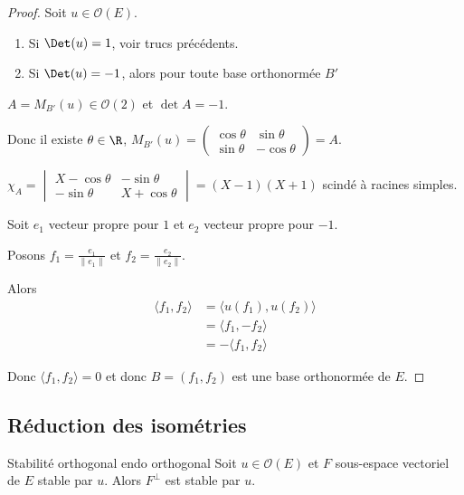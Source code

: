 \begin{proof}
    Soit $u \in \mathcal O(E)$. 
    \begin{enumerate}
        \item Si $\Det(u) = 1$, voir trucs précédents. 
        \item Si $\Det(u) = -1$, alors pour toute base orthonormée $B'$
    \end{enumerate}

    $A = M_{B'}(u) \in \mathcal O(2)$ et $\det A = -1$.

    Donc il existe $\theta \in \R$, $M_{B'}(u) = \begin{pmatrix}
        \cos \theta & \sin \theta \\
        \sin \theta & -\cos \theta
    \end{pmatrix} = A$. 

    $\chi_A = \begin{vmatrix}
        X - \cos \theta & -\sin \theta \\
        -\sin \theta & X + \cos \theta
    \end{vmatrix} = (X- 1)(X + 1)$ scindé à racines simples. 

    Soit $e_1$ vecteur propre pour $1$ et $e_2$ vecteur propre pour $-1$.

    Posons $f_1 = \frac{e_1}{\| e_1 \|}$ et $f_2 = \frac{e_2}{\| e_2 \|}$. 

    Alors 
    \begin{align}
        \langle f_1, f_2 \rangle & = \langle u (f_1), u (f_2) \rangle \\
        & = \langle f_1, - f_2 \rangle \\
        & = - \langle f_1, f_2 \rangle
    \end{align}

    Donc $\langle f_1, f_2 \rangle = 0$ et donc $B = (f_1, f_2)$ est une base orthonormée de $E$.
\end{proof}

\subsection{Réduction des isométries }

\begin{proposition}{Stabilité orthogonal endo orthogonal}{}
    Soit $u \in \mathcal O(E)$ et $F$ sous-espace vectoriel de $E$ stable par $u$. Alors 
    $F^\perp$ est stable par $u$. 
\end{proposition}

